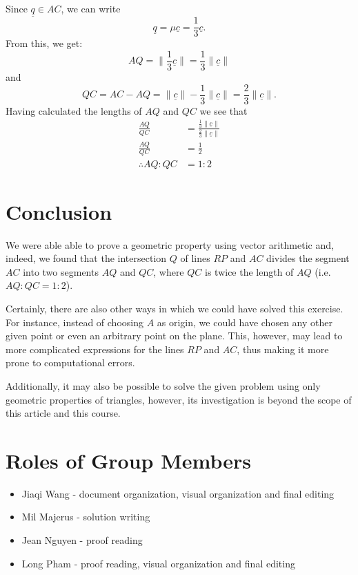 \documentclass{article}
\renewcommand{\v}[1]{\underline{#1}}
\begin{document}
    Since $\v{q} \in AC$, we can write $$\v{q} = \mu \v{c} = \frac{1}{3} \v{c}.$$
    From this, we get:
    $$AQ = \lVert\frac{1}{3} \v{c}\rVert = \frac{1}{3}\lVert\v{c}\rVert$$
    and $$QC = AC - AQ = \lVert\v{c}\rVert - \frac{1}{3}\lVert\v{c}\rVert =  \frac{2}{3}\lVert\v{c}\rVert.$$
    Having calculated the lengths of $AQ$ and $QC$ we see that
    \begin{align*}
    \frac{AQ}{QC} &= \frac{\frac{1}{3}\lVert\v{c}\rVert}{\frac{2}{3}\lVert\v{c}\rVert} \\
    \frac{AQ}{QC} &=\frac{1}{2} \\
    \therefore AQ : QC &= 1 : 2
    \end{align*}

    \section{Conclusion}
    We were able able to prove a geometric property using vector arithmetic and, indeed, we found that the intersection $Q$ of lines $RP$ and $AC$ divides the segment $AC$
    into two segments $AQ$ and $QC$, where $QC$ is twice the length of $AQ$ (i.e. $AQ:QC = 1:2$).

    Certainly, there are also other ways in which we could have solved this exercise. For instance, instead of choosing $A$ as origin,
    we could have chosen any other given point or even an arbitrary point on the plane. This, however, may lead
    to more complicated expressions for the lines $RP$ and $AC$, thus making it more prone to computational errors.

     Additionally, it may also be possible to solve the given problem using only geometric properties of triangles, however, its investigation is beyond the scope of this article and this course.

\newpage
    \section{Roles of Group Members}

    \begin{itemize}
        \item Jiaqi Wang - document organization, visual organization and final editing
        \item Mil Majerus - solution writing
        \item Jean Nguyen - proof reading
        \item Long Pham - proof reading, visual organization and final editing
    \end{itemize}

    
    
\end{document}
